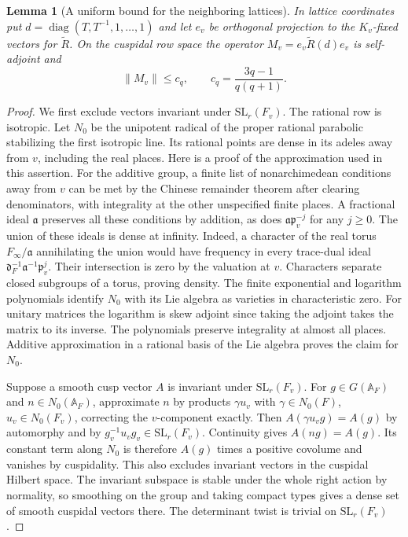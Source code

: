 \documentclass[a4paper,11pt]{article}
\newtheorem{lemma}[proposition]{Lemma}
\theoremstyle{definition}
\theoremstyle{remark}
\numberwithin{equation}{section}
\begin{document}
\begin{lemma}[A uniform bound for the neighboring lattices]
\label{lem:coefficient199}
In lattice coordinates put \(d=\operatorname{diag}(T,T^{-1},1,\ldots,1)\)
and let \(e_v\) be orthogonal projection to the \(K_v\)-fixed
vectors for \(\widetilde R\). On the cuspidal row space the operator
\(M_v=e_v\widetilde R(d)e_v\) is self-adjoint and
\begin{equation}
        \|M_v\|\le c_q,\qquad c_q=\frac{3q-1}{q(q+1)} .
                                                \label{eq:constant199}
\end{equation}
\end{lemma}
\begin{proof}
We first exclude vectors invariant under \(\mathrm{SL}_r(F_v)\).
The rational row is isotropic. Let \(N_0\) be the unipotent
radical of the proper rational parabolic stabilizing the first
isotropic line. Its rational points are dense in its adeles
away from \(v\), including the real places. Here is a proof of
the approximation used in this assertion. For the additive
group, a finite list of nonarchimedean conditions away from \(v\)
can be met by the Chinese remainder theorem after clearing
denominators, with integrality at the other unspecified finite
places. A fractional ideal \(\mathfrak a\) preserves all these
conditions by addition, as does \(\mathfrak a\mathfrak p_v^{-j}\)
for any \(j\ge0\). The union of these ideals is dense at infinity.
Indeed, a character of the real torus \(F_\infty/\mathfrak a\)
annihilating the union would have frequency in every trace-dual
ideal \(\mathfrak d_F^{-1}\mathfrak a^{-1}\mathfrak p_v^j\).
Their intersection is zero by the valuation at \(v\).
Characters separate closed subgroups of a torus, proving density.
The finite exponential and logarithm polynomials identify \(N_0\)
with its Lie algebra as varieties in characteristic zero. For
unitary matrices the logarithm is skew adjoint since taking the
adjoint takes the matrix to its inverse. The polynomials preserve
integrality at almost all places. Additive approximation in a
rational basis of the Lie algebra proves the claim for \(N_0\).

Suppose a smooth cusp vector \(A\) is invariant under
\(\mathrm{SL}_r(F_v)\). For \(g\in G(\mathbb A_F)\) and
\(n\in N_0(\mathbb A_F)\), approximate \(n\) by products
\(\gamma u_v\) with \(\gamma\in N_0(F)\), \(u_v\in N_0(F_v)\),
correcting the \(v\)-component exactly. Then
\(A(\gamma u_vg)=A(g)\) by automorphy and by
\(g_v^{-1}u_vg_v\in\mathrm{SL}_r(F_v)\). Continuity gives
\(A(ng)=A(g)\). Its constant term along \(N_0\) is therefore
\(A(g)\) times a positive covolume and vanishes by cuspidality.
This also excludes invariant vectors in the cuspidal Hilbert space.
The invariant subspace is stable under the whole right action
by normality, so smoothing on the group and taking compact
types gives a dense set of smooth cuspidal vectors there.
The determinant twist is trivial on \(\mathrm{SL}_r(F_v)\).


\end{proof}
\end{document}
